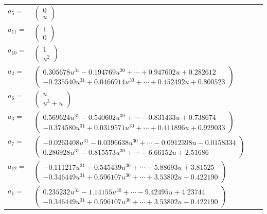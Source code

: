 \documentclass[1p]{elsarticle_modified}
\theoremstyle{definition}
\begin{document}
\begin{tabular}{m{7pt} m{180pt} m{7pt} m{180pt} }
\flushright $a_{5}=$&$\begin{pmatrix}0\\u\end{pmatrix}$ \\
\flushright $a_{11}=$&$\begin{pmatrix}1\\0\end{pmatrix}$ \\
\flushright $a_{10}=$&$\begin{pmatrix}1\\u^2\end{pmatrix}$ \\
\flushright $a_{2}=$&$\begin{pmatrix}0.305678 u^{31}-0.194769 u^{30}+\cdots+0.947602 u+0.282612\\-0.235540 u^{31}+0.0466914 u^{30}+\cdots+0.152492 u+0.800523\end{pmatrix}$ \\
\flushright $a_{6}=$&$\begin{pmatrix}u\\u^3+u\end{pmatrix}$ \\
\flushright $a_{3}=$&$\begin{pmatrix}0.569624 u^{31}-0.540602 u^{30}+\cdots-0.831433 u+0.738674\\-0.374580 u^{31}+0.0319571 u^{30}+\cdots+0.411896 u+0.929033\end{pmatrix}$ \\
\flushright $a_{7}=$&$\begin{pmatrix}-0.0263408 u^{31}-0.0396638 u^{30}+\cdots-0.0912398 u-0.0158334\\0.286928 u^{31}-0.815573 u^{30}+\cdots-6.66152 u+2.51686\end{pmatrix}$ \\
\flushright $a_{12}=$&$\begin{pmatrix}-0.111217 u^{31}-0.545439 u^{30}+\cdots-5.88693 u+3.81525\\-0.346449 u^{31}+0.596107 u^{30}+\cdots+3.53802 u-0.422190\end{pmatrix}$ \\
\flushright $a_{1}=$&$\begin{pmatrix}0.235232 u^{31}-1.14155 u^{30}+\cdots-9.42495 u+4.23744\\-0.346449 u^{31}+0.596107 u^{30}+\cdots+3.53802 u-0.422190\end{pmatrix}$ \\

\end{tabular}
\end{document}

